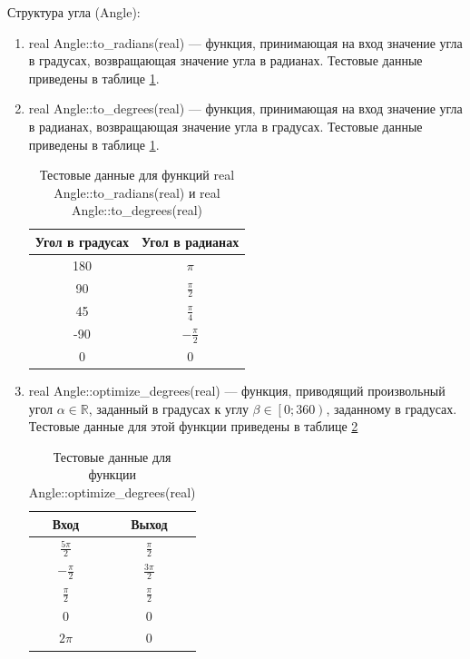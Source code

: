 Структура угла (Angle):
\begin{enumerate}
	\item real Angle::to\_radians(real) --- функция, принимающая на вход значение угла в градусах, возвращающая значение угла в радианах. Тестовые данные приведены в таблице \ref{tbl:to_radians}.
	\item real Angle::to\_degrees(real) --- функция, принимающая на вход значение угла в радианах, возвращающая значение угла в градусах. Тестовые данные приведены в таблице \ref{tbl:to_radians}.
	\begin{table}
		\centering
		\caption{Тестовые данные для функций real Angle::to\_radians(real) и real Angle::to\_degrees(real)}
		\label{tbl:to_radians}
		\begin{tabular}{|c|c|}
			\hline
			Угол в градусах & Угол в радианах \\
			\hline
			180	& $\pi$	\\
			90	& $\frac{\pi}{2}$ \\
			45	& $\frac{\pi}{4}$ \\
			-90 & $-\frac{\pi}{2}$ \\
			0	& 0 \\
			\hline
		\end{tabular}
	\end{table}
	
	\item real Angle::optimize\_degrees(real) --- функция, приводящий произвольный угол $\alpha\in\mathbb{R}$, заданный в градусах к углу $\beta\in\left[0; 360\right)$, заданному в градусах. Тестовые данные для этой функции приведены в таблице \ref{tbl:optimize_radians}
	\begin{table}
		\centering
		\caption{Тестовые данные для функции Angle::optimize\_degrees(real)}
		\label{tbl:optimize_radians}
		\begin{tabular}{|c|c|}
			\hline
			Вход & Выход \\
			\hline
			$\frac{5\pi}{2}$ & $\frac{\pi}{2}$ \\
			$-\frac{\pi}{2}$ & $\frac{3\pi}{2}$	\\
			$\frac{\pi}{2}$ & $\frac{\pi}{2}$ \\
			$0$ & $0$ \\
			$2\pi$ & $0$ \\
			\hline
		\end{tabular}
	\end{table}
	

\end{enumerate}
